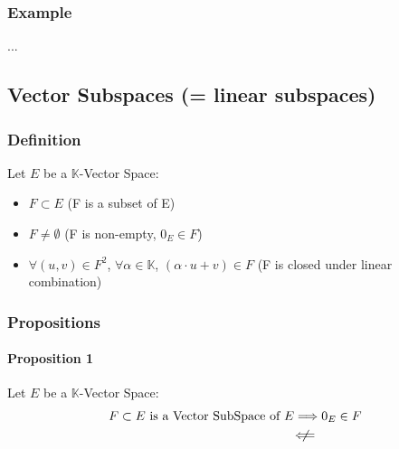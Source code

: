 \documentclass[notitlepage]{math}
\begin{document}
\subsubsection{Example}
...
\subsection{Vector Subspaces (= linear subspaces)}
\subsubsection{Definition}
Let $E$ be a $\mathbb{K}$-Vector Space:\\
\begin{itemize}
    \item $F \subset E$ {\color{green}(F is a subset of E)}
    \item $F \neq \emptyset$ {\color{green}(F is non-empty, $0_E \in F$)}
    \item $\forall (u, v) \in F^2$, $\forall \alpha \in \mathbb{K}$, $(\alpha \cdot u + v) \in F$ {\color{green}(F is closed under linear combination)}
\end{itemize}
\subsubsection{Propositions}
\paragraph{Proposition 1}
Let $E$ be a $\mathbb{K}$-Vector Space:
\begin{align*}
    F \subset E \text{ is a Vector SubSpace of } E &\Longrightarrow 0_E \in F\\
    &\;\not\!\!\!\Longleftarrow  
\end{align*}
\end{document}
